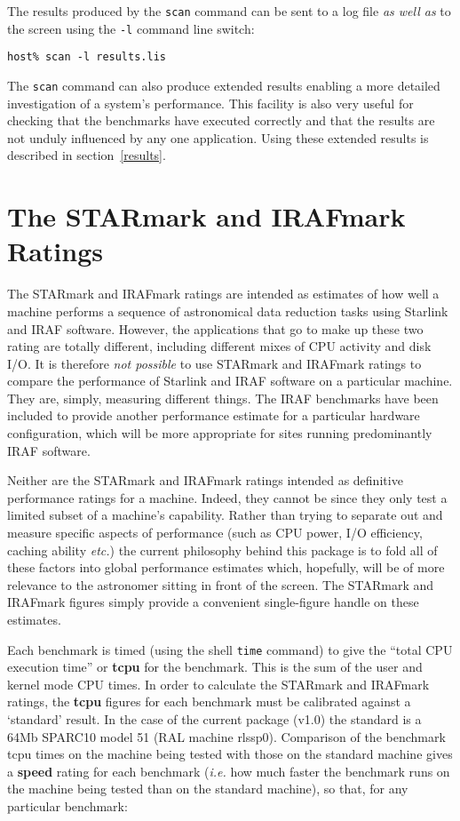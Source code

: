 \documentclass[11pt]{article}
\newcommand{\pkgver}     {v1.0}
\begin{document}
The results produced by the {\tt scan} command can be sent to a log file
{\em as well as} to the screen using the {\tt -l} command line switch:

{\tt host\% scan -l results.lis}

The {\tt scan} command can also produce extended results enabling a
more detailed investigation of a system's performance. This facility is
also very useful for checking that the benchmarks have executed correctly
and that the results are not unduly influenced by any one application.
Using these extended results is described in section~\ref{results}.
  
\newpage
\section{The STARmark and IRAFmark Ratings}
\label{starmark}

The STARmark and IRAFmark ratings are intended as estimates of how well a
machine performs a sequence of astronomical data reduction tasks using
Starlink and IRAF software. However, the applications that go to make up
these two rating are totally different, including different mixes of CPU
activity and disk I/O. It is therefore {\em not possible} to use STARmark
and IRAFmark ratings to compare the performance of Starlink and IRAF
software on a particular machine.  They are, simply, measuring different
things. The IRAF benchmarks have been included to provide another
performance estimate for a particular hardware configuration, which will
be more appropriate for sites running predominantly IRAF software. 

Neither are the STARmark and IRAFmark ratings intended as definitive
performance ratings for a machine. Indeed, they cannot be since they
only test a limited subset of a machine's capability.  Rather than
trying to separate out and measure specific aspects of performance
(such as CPU power, I/O efficiency, caching ability {\em etc.}) the
current philosophy behind this package is to fold all of these factors
into global performance estimates which, hopefully, will be of more
relevance to the astronomer sitting in front of the screen.  The
STARmark and IRAFmark figures simply provide a convenient single-figure
handle on these estimates.

Each benchmark is timed (using the shell {\tt time} command) to give
the ``total CPU execution time'' or {\bf tcpu} for the benchmark. This
is the sum of the user and kernel mode CPU times. In order to calculate
the STARmark and IRAFmark ratings, the {\bf tcpu} figures for each
benchmark must be calibrated against a `standard' result.  In the case
of the current package (\pkgver) the standard is a 64Mb SPARC10 model
51 (RAL machine rlssp0). Comparison of the benchmark tcpu times on the
machine being tested with those on the standard machine gives a {\bf
speed} rating for each benchmark ({\em i.e.} how much faster the
benchmark runs on the machine being tested than on the standard
machine), so that, for any particular benchmark:
\end{document}
